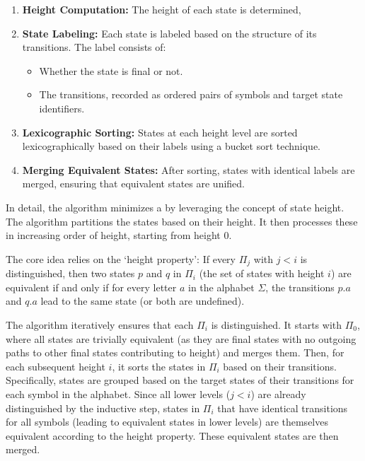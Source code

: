 \begin{enumerate}
    \item \textbf{Height Computation:} The height of each state is determined,  
    \item \textbf{State Labeling:} Each state is labeled based on the structure of its transitions. The label consists of:
    \begin{itemize}
        \item Whether the state is final or not.
        \item The transitions, recorded as ordered pairs of symbols and target state identifiers.
    \end{itemize}
    \item \textbf{Lexicographic Sorting:} States at each height level are sorted lexicographically based on their labels using a bucket sort technique.
    \item \textbf{Merging Equivalent States:} After sorting, states with identical labels are merged, ensuring that equivalent states are unified.
\end{enumerate}

In detail, the algorithm minimizes a by leveraging the concept of state height. The algorithm partitions the states based on their height. It then processes these  in increasing order of height, starting from height 0.

The core idea relies on the `height property': If every $\Pi_j$ with $j < i$ is distinguished, then two states $p$ and $q$ in $\Pi_i$ (the set of states with height $i$) are equivalent if and only if for every letter $a$ in the alphabet $\Sigma$, the transitions $p.a$ and $q.a$ lead to the same state (or both are undefined).

The algorithm iteratively ensures that each $\Pi_i$ is distinguished. It starts with $\Pi_0$, where all states are trivially equivalent (as they are final states with no outgoing paths to other final states contributing to height) and merges them. Then, for each subsequent height $i$, it sorts the states in $\Pi_i$ based on their transitions. Specifically, states are grouped based on the target states of their transitions for each symbol in the alphabet. Since all lower levels ($j < i$) are already distinguished by the inductive step, states in $\Pi_i$ that have identical transitions for all symbols (leading to equivalent states in lower levels) are themselves equivalent according to the height property. These equivalent states are then merged.

